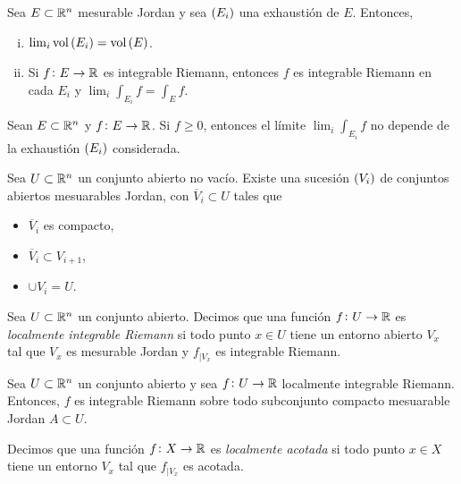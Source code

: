 \begin{prop}
    Sea $E \subset \mathbb{R}^n$ mesurable Jordan y sea $\left( E_i \right)$ una exhaustión de $E$. Entonces,
    \begin{enumerate}[(i)]
        \item $\lim_i \operatorname{vol} \left( E_i \right) = \operatorname{vol} \left( E \right)$.
        \item Si $f \colon E \to \mathbb{R} $ es integrable Riemann, entonces $f$ es integrable Riemann en cada $E_i$ y $\lim_i \int_{E_i} f = \int_E f$.
    \end{enumerate}
\end{prop}

\begin{prop}
    Sean $E \subset \mathbb{R}^n$ y $f \colon E \to \mathbb{R}$. Si $f\geq 0$, entonces el límite $\lim_i \int_{E_i} f$ no depende de la exhaustión $\left( E_i \right)$ considerada.
\end{prop}

\begin{lema}[(de la cebolla)]
    Sea $U \subset \mathbb{R}^n$ un conjunto abierto no vacío. Existe una sucesión $\left( V_i \right) $ de conjuntos abiertos mesuarables Jordan, con $\overline{V}_i \subset U$ tales que
    \begin{itemize}
        \item $\overline{V}_i$ es compacto,
        \item $\overline{V}_i \subset V_{i+1}$,
        \item $\cup V_i = U$.
    \end{itemize}
\end{lema}

\begin{defi}
    Sea $U \subset \mathbb{R}^n$ un conjunto abierto. Decimos que una función $f \colon U \to \mathbb{R}$ es \textit{localmente integrable Riemann} si todo punto $x \in U$ tiene un entorno abierto $V_x$ tal que $V_x$ es mesurable Jordan y $f_{|V_x}$ es integrable Riemann.
\end{defi}

\begin{prop}
    Sea $U\subset \mathbb{R}^n$ un conjunto abierto y sea $f\colon U \to \mathbb{R}$ localmente integrable Riemann. Entonces, $f$ es integrable Riemann sobre todo subconjunto compacto mesuarable Jordan $A \subset U$.
\end{prop}

\begin{defi}
    Decimos que una función $f \colon X \to \mathbb{R}$ es \textit{localmente acotada} si todo punto $x \in X$ tiene un entorno $V_x$ tal que $f_{|V_x}$ es acotada.
\end{defi}

